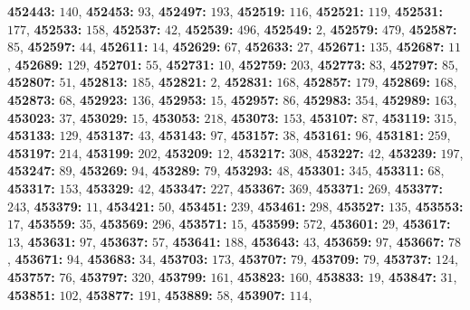\textsf{\bfseries 452443:} $140$, \textsf{\bfseries 452453:} $93$, \textsf{\bfseries 452497:} $193$, \textsf{\bfseries 452519:} $116$, \textsf{\bfseries 452521:} $119$, \textsf{\bfseries 452531:} $177$, \textsf{\bfseries 452533:} $158$, \textsf{\bfseries 452537:} $42$, \textsf{\bfseries 452539:} $496$, \textsf{\bfseries 452549:} $2$, \textsf{\bfseries 452579:} $479$, \textsf{\bfseries 452587:} $85$, \textsf{\bfseries 452597:} $44$, \textsf{\bfseries 452611:} $14$, \textsf{\bfseries 452629:} $67$, \textsf{\bfseries 452633:} $27$, \textsf{\bfseries 452671:} $135$, \textsf{\bfseries 452687:} $11$, \textsf{\bfseries 452689:} $129$, \textsf{\bfseries 452701:} $55$, \textsf{\bfseries 452731:} $10$, \textsf{\bfseries 452759:} $203$, \textsf{\bfseries 452773:} $83$, \textsf{\bfseries 452797:} $85$, \textsf{\bfseries 452807:} $51$, \textsf{\bfseries 452813:} $185$, \textsf{\bfseries 452821:} $2$, \textsf{\bfseries 452831:} $168$, \textsf{\bfseries 452857:} $179$, \textsf{\bfseries 452869:} $168$, \textsf{\bfseries 452873:} $68$, \textsf{\bfseries 452923:} $136$, \textsf{\bfseries 452953:} $15$, \textsf{\bfseries 452957:} $86$, \textsf{\bfseries 452983:} $354$, \textsf{\bfseries 452989:} $163$, \textsf{\bfseries 453023:} $37$, \textsf{\bfseries 453029:} $15$, \textsf{\bfseries 453053:} $218$, \textsf{\bfseries 453073:} $153$, \textsf{\bfseries 453107:} $87$, \textsf{\bfseries 453119:} $315$, \textsf{\bfseries 453133:} $129$, \textsf{\bfseries 453137:} $43$, \textsf{\bfseries 453143:} $97$, \textsf{\bfseries 453157:} $38$, \textsf{\bfseries 453161:} $96$, \textsf{\bfseries 453181:} $259$, \textsf{\bfseries 453197:} $214$, \textsf{\bfseries 453199:} $202$, \textsf{\bfseries 453209:} $12$, \textsf{\bfseries 453217:} $308$, \textsf{\bfseries 453227:} $42$, \textsf{\bfseries 453239:} $197$, \textsf{\bfseries 453247:} $89$, \textsf{\bfseries 453269:} $94$, \textsf{\bfseries 453289:} $79$, \textsf{\bfseries 453293:} $48$, \textsf{\bfseries 453301:} $345$, \textsf{\bfseries 453311:} $68$, \textsf{\bfseries 453317:} $153$, \textsf{\bfseries 453329:} $42$, \textsf{\bfseries 453347:} $227$, \textsf{\bfseries 453367:} $369$, \textsf{\bfseries 453371:} $269$, \textsf{\bfseries 453377:} $243$, \textsf{\bfseries 453379:} $11$, \textsf{\bfseries 453421:} $50$, \textsf{\bfseries 453451:} $239$, \textsf{\bfseries 453461:} $298$, \textsf{\bfseries 453527:} $135$, \textsf{\bfseries 453553:} $17$, \textsf{\bfseries 453559:} $35$, \textsf{\bfseries 453569:} $296$, \textsf{\bfseries 453571:} $15$, \textsf{\bfseries 453599:} $572$, \textsf{\bfseries 453601:} $29$, \textsf{\bfseries 453617:} $13$, \textsf{\bfseries 453631:} $97$, \textsf{\bfseries 453637:} $57$, \textsf{\bfseries 453641:} $188$, \textsf{\bfseries 453643:} $43$, \textsf{\bfseries 453659:} $97$, \textsf{\bfseries 453667:} $78$, \textsf{\bfseries 453671:} $94$, \textsf{\bfseries 453683:} $34$, \textsf{\bfseries 453703:} $173$, \textsf{\bfseries 453707:} $79$, \textsf{\bfseries 453709:} $79$, \textsf{\bfseries 453737:} $124$, \textsf{\bfseries 453757:} $76$, \textsf{\bfseries 453797:} $320$, \textsf{\bfseries 453799:} $161$, \textsf{\bfseries 453823:} $160$, \textsf{\bfseries 453833:} $19$, \textsf{\bfseries 453847:} $31$, \textsf{\bfseries 453851:} $102$, \textsf{\bfseries 453877:} $191$, \textsf{\bfseries 453889:} $58$, \textsf{\bfseries 453907:} $114$, 
